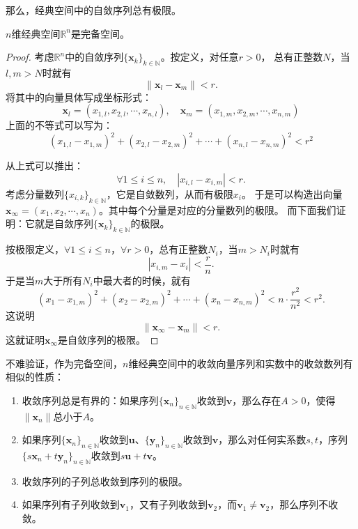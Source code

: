 \documentclass[12pt,UTF8]{ctexbook}
\begin{document}
\begin{appendix}
那么，经典空间中的自敛序列总有极限。
\begin{tm}\label{tm:b-0-40}
    $n$维经典空间$\mathbb{R}^n$是完备空间。
\end{tm}

\begin{proof}
    考虑$\mathbb{R}^n$中的自敛序列$\{\mathbf{x}_k\}_{k\in\mathbb{N}}$。按定义，对任意$r>0$，
    总有正整数$N$，当$l, m>N$时就有
    $$ \| \mathbf{x}_l - \mathbf{x}_m\| < r. $$
    将其中的向量具体写成坐标形式：
    $$ \mathbf{x}_l = (x_{1,l},x_{2,l}, \cdots, x_{n,l}), \quad \mathbf{x}_m = (x_{1,m},x_{2,m}, \cdots, x_{n,m})$$
    上面的不等式可以写为：
    $$ (x_{1,l} - x_{1,m})^2 + (x_{2,l} - x_{2,m})^2 + \cdots + (x_{n,l} - x_{n,m})^2 < r^2$$

    从上式可以推出：
    $$ \forall 1\leqslant i \leqslant n, \quad |x_{i,l} - x_{i,m} | < r. $$
    考虑分量数列$\{x_{i,k}\}_{k\in\mathbb{N}}$，它是自敛数列，从而有极限$x_i$。
    于是可以构造出向量$\mathbf{x}_{\infty} = (x_1,x_2,\cdots, x_n)$。其中每个分量是对应的分量数列的极限。
    而下面我们证明：它就是自敛序列$\{\mathbf{x}_k\}_{k\in\mathbb{N}}$的极限。

    按极限定义，$\forall 1\leqslant i \leqslant n$，$\forall r>0$，总有正整数$N_i$，当$m>N_i$时就有
    $$ | x_{i,m} - x_i| < \frac{r}{n}. $$
    于是当$m$大于所有$N_i$中最大者的时候，就有
    $$ (x_1 - x_{1,m})^2 + (x_2 - x_{2,m})^2 + \cdots + (x_n - x_{n,m})^2 < n\cdot \frac{r^2}{n^2} < r^2.$$
    这说明
    $$ \| \mathbf{x}_{\infty} - \mathbf{x}_m \| < r. $$
    这就证明$\mathbf{x}_{\infty}$是自敛序列的极限。

\end{proof}

不难验证，作为完备空间，$n$维经典空间中的收敛向量序列和实数中的收敛数列有相似的性质：
\begin{enumerate}
    \item 收敛序列总是有界的：如果序列$\{\mathbf{x}_n\}_{n\in\mathbb{N}}$收敛到$\mathbf{v}$，那么存在$A>0$，使得$\|\mathbf{x}_n\|$总小于$A$。
    \item 如果序列$\{\mathbf{x}_n\}_{n\in\mathbb{N}}$收敛到$\mathbf{u}$、$\{\mathbf{y}_n\}_{n\in\mathbb{N}}$收敛到$\mathbf{v}$，那么对任何实系数$s,t$，序列$\{s\mathbf{x}_n + t\mathbf{y}_n\}_{n\in\mathbb{N}}$收敛到$s\mathbf{u} + t\mathbf{v}$。
    \item 收敛序列的子列总收敛到序列的极限。
    \item 如果序列有子列收敛到$\mathbf{v}_1$，又有子列收敛到$\mathbf{v}_2$，而$\mathbf{v}_1\neq \mathbf{v}_2$，那么序列不收敛。
\end{enumerate}


\end{appendix}
\end{document}
